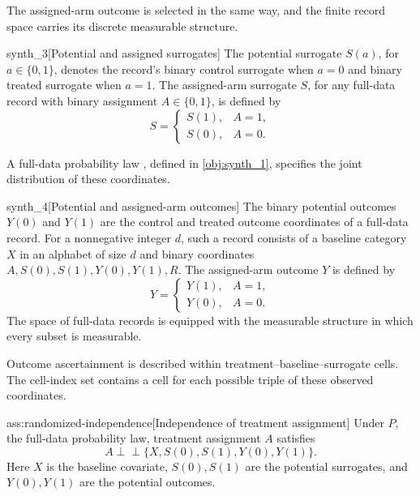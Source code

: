 The assigned-arm outcome  is selected in the same way, and the finite record space carries its discrete measurable structure.

\begin{definitionv}{synth_3}[Potential and assigned surrogates]
The potential surrogate \(S(a)\), for \(a\in\{0,1\}\), denotes the record's binary control surrogate when \(a=0\) and binary treated surrogate when \(a=1\). The assigned-arm surrogate \(S\), for any full-data record with binary assignment \(A\in\{0,1\}\), is defined by
\[
S=
\begin{cases}
S(1), & A=1,\\
S(0), & A=0.
\end{cases}
\]
\end{definitionv}

A full-data probability law , defined in \cref{obj:synth_1}, specifies the joint distribution of these coordinates.

\begin{definitionv}{synth_4}[Potential and assigned-arm outcomes]
The binary potential outcomes \(Y(0)\) and \(Y(1)\) are the control and treated outcome coordinates of a full-data record. For a nonnegative integer \(d\), such a record consists of a baseline category \(X\) in an alphabet of size \(d\) and binary coordinates \(A,S(0),S(1),Y(0),Y(1),R\). The assigned-arm outcome \(Y\) is defined by
\[
Y=
\begin{cases}
Y(1), & A=1,\\
Y(0), & A=0.
\end{cases}
\]
The space of full-data records is equipped with the measurable structure in which every subset is measurable.
\end{definitionv}

Outcome ascertainment is described within treatment--baseline--surrogate cells. The cell-index set  contains a cell  for each possible triple of these observed coordinates.

\begin{assumptionv}{ass:randomized-independence}[Independence of treatment assignment]
Under \(P\), the full-data probability law, treatment assignment \(A\) satisfies
\[
A\perp\!\!\!\perp\{X,S(0),S(1),Y(0),Y(1)\}.
\]
Here \(X\) is the baseline covariate, \(S(0),S(1)\) are the potential surrogates, and \(Y(0),Y(1)\) are the potential outcomes.
\end{assumptionv}

